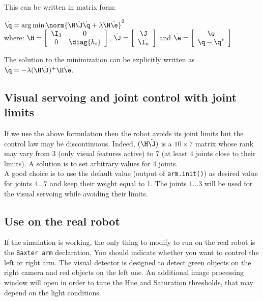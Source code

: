 \documentclass{ecnreport}
\begin{document}
This can be written in matrix form: 
\begin{center}
	$\dot \q = \arg\min \norm{\H\tilde\J\dot \q + \lambda\H\tilde\e}^2$ \\
 where: $\H = \left[\begin{array}{cc}\I_3 & 0 \\ 0 & \diag{h_i}\end{array}\right]$,
 $\tilde\J = \left[\begin{array}{c}\J \\ \I_n \end{array}\right]$ and
  $\tilde\e = \left[\begin{array}{c}\e \\ \q - \q^* \end{array}\right]$
\end{center}
The solution to the minimization can be explicitly written as $\dot \q = -\lambda(\H\tilde\J)^+\H\tilde\e$.\\

\subsection{Visual servoing and joint control with joint limits }

If we use the above formulation then the robot avoids its joint limits but the control law may be discontinuous. Indeed, $(\H\tilde\J)$ is a $10\times 7$ matrix whose rank may vary from 3 (only visual features active) to 7 (at least 4 joints close to their limits). A solution is to set arbitrary values for 4 joints. \\

A good choice is to use the default value (output of \texttt{arm.init()}) as desired value for joints $4\hdots7$ and keep their weight equal to 1. 
The joints $1\hdots 3$ will be used for the visual servoing while avoiding their limits.

\subsection{Use on the real robot}

If the simulation is working, the only thing to modify to run on the real robot is the \texttt{Baxter arm} declaration. You should indicate whether you want to control the left or right arm. The visual detector is designed to detect green objects on the right camera and red objects on the left one. An additional image processing window will open in order to tune the Hue and Saturation thresholds, that may depend on the light conditions.\\
\end{document}
